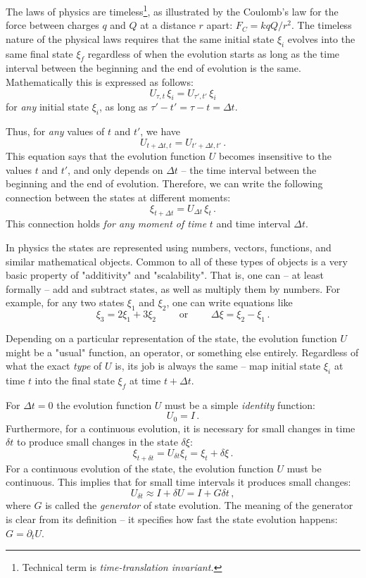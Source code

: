 
The laws of physics are timeless\footnote{Technical term is \emph{time-translation invariant.}}, as illustrated by the Coulomb's law for the force between charges $q$ and $Q$ at a distance $r$ apart: $F_C=k qQ/r^2$. The timeless nature of the physical laws requires that the same initial state $\xi_i$ evolves into the same final state $\xi_f$ regardless of when the evolution starts as long as the time interval between the beginning and the end of evolution is the same. Mathematically this is expressed as follows:
\[
U_{\tau, t}\,\xi_i  = U_{\tau', t'}\,\xi_i
\]
for \emph{any} initial state $\xi_i$, as long as $\tau'-t'=\tau-t=\Delta t$.

Thus, for \emph{any} values of $t$ and $t'$, we have
\[
U_{t+\Delta t, t}  = U_{t'+\Delta t, t'}\,.
\]
This equation says that the evolution function $U$ becomes insensitive to the values $t$ and $t'$, and only depends on $\Delta t$ -- the time interval between the beginning and the end of evolution. Therefore, we can write the following connection between the states at different moments:
\[
\xi_{t+\Delta t} = U_{\Delta t}\,\xi_t\,.
\]
This connection holds \emph{for any moment of time} $t$ and time interval $\Delta t$.

In physics the states are represented using numbers, vectors, functions, and similar mathematical objects. Common to all of these types of objects is a very basic property of "additivity" and "scalability". That is, one can -- at least formally -- add and subtract states, as well as multiply them by numbers. For example, for any two states $\xi_1$ and $\xi_2$, one can write  equations like
\[
\xi_3 = 2\xi_1 + 3\xi_2\qquad\textrm{ or }\qquad \Delta \xi = \xi_2 - \xi_1\,.
\]

Depending on a particular representation of the state, the evolution function $U$ might be a "usual" function, an operator, or something else entirely. Regardless of what the exact \emph{type} of $U$ is, its job is always the same -- map initial state $\xi_i$ at time $t$ into the final state $\xi_f$ at time $t+\Delta t$.

For $\Delta t = 0$ the evolution function $U$ must be a simple \emph{identity} function:
\[
U_0 = I\,.
\]
Furthermore, for a continuous evolution, it is necessary for small changes in time $\delta t$ to produce small changes in the state $\delta \xi$:
\[
\xi_{t+\delta t} = U_{\delta t} \xi_t = \xi_t + \delta \xi\,.
\] 
For a continuous evolution of the state, the evolution function $U$ must be continuous. This implies that for small time intervals it produces small changes:
\[
U_{\delta t} \approx I + \delta U = I + G\delta t\,,
\]
where $G$ is called the \emph{generator} of state evolution. The meaning of the generator is clear from its definition -- it specifies how fast the state evolution happens: $G=\partial_t U$.

